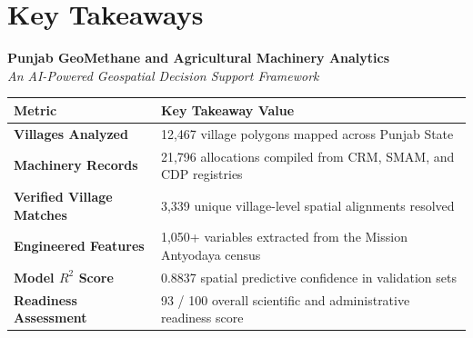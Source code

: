 \documentclass[12pt,a4paper]{report}
\begin{document}
\chapter*{Key Takeaways}
\begin{center}
    \vspace*{1.5cm}
    \begin{minipage}{0.8\textwidth}
        \centering
        \large
        \textbf{Punjab GeoMethane and Agricultural Machinery Analytics} \\
        \vspace{0.2cm}
        \normalsize \textit{An AI-Powered Geospatial Decision Support Framework} \\
        \vspace{1.5cm}
        
        \begin{longtable}{lp{8cm}}
        \toprule
        \textbf{Metric} & \textbf{Key Takeaway Value} \\
        \midrule
        \textbf{Villages Analyzed} & 12,467 village polygons mapped across Punjab State \\
        \textbf{Machinery Records} & 21,796 allocations compiled from CRM, SMAM, and CDP registries \\
        \textbf{Verified Village Matches} & 3,339 unique village-level spatial alignments resolved \\
        \textbf{Engineered Features} & 1,050+ variables extracted from the Mission Antyodaya census \\
        \textbf{Model $R^2$ Score} & 0.8837 spatial predictive confidence in validation sets \\
        \textbf{Readiness Assessment} & 93 / 100 overall scientific and administrative readiness score \\
        \bottomrule
        \end{longtable}
    \end{minipage}
\end{center}

\newpage




\appendix
\end{document}
